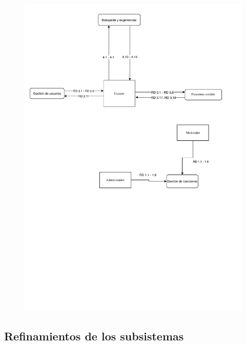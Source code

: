 \begin{figure}[H]
  \centering
  \includegraphics[scale=0.9]{diagramas/Esquema_armazon.pdf}
\end{figure}

\subsection{Refinamientos de los subsistemas}

